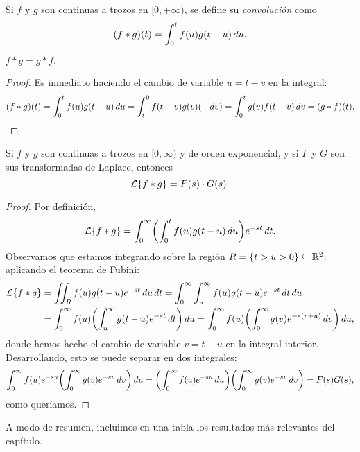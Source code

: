 \documentclass[../ecuaciones_diferenciales.tex]{subfiles}
\begin{document}
\begin{definition}
	Si \(f\) y \(g\) son continuas a trozos en \([0,+\infty)\), se define su
	\emph{convolución} como
	\[(f \ast g)(t) = \int_0^t f(u) g(t-u) \mathop{d\!} u.\]
\end{definition}

\begin{remark}
	\(f \ast g = g \ast f.\)
	\begin{proof}
		Es inmediato haciendo el cambio de variable \(u = t-v\) en la integral:
		\[(f \ast g)(t) = \int_0^t f(u) g(t-u) \mathop{d\!} u = \int_t^0 f(t-v)g(v)
			(-\mathop{d\!} v) = \int_0^t g(v) f(t-v) \mathop{d\!} v = (g \ast f)(t).\]
	\end{proof}
\end{remark}

\begin{theorem}
	Si \(f\) y \(g\) son continuas a trozos en \([0,\infty)\) y de orden
	exponencial, y si \(F\) y \(G\) son sus transformadas de Laplace, entonces
	\[\operatorname{\mathcal{L}}\{f \ast g\} = F(s) \cdot G(s).\]
	\begin{proof}
		Por definición,
		\[\laplace\{f \ast g\} = \int_0^\infty \left( \int_0^t f(u)g(t-u) \dif u \right)
			e^{-st} \dif t.\]
		Observamos que estamos integrando sobre la región \(R = \{t > u > 0\} \subseteq
		\mathbb{R}^2\); aplicando el teorema de Fubini:
		\begin{align*}
			\laplace\{f \ast g\}
			 & = \iint_R f(u) g(t-u) e^{-st} \dif u \dif t
			= \int_0^\infty \int_u^\infty f(u)g(t-u)e^{-st} \dif t \dif u            \\
			 & = \int_0^\infty f(u) \left(\int_u^\infty g(t-u)e^{-st} \dif t \right)
			\dif u = \int_0^\infty f(u) \left( \int_0^\infty g(v)e^{-s(v+u)} \dif v
			\right) \dif u,
		\end{align*}
		donde hemos hecho el cambio de variable \(v = t-u\) en la integral
		interior. Desarrollando, esto se puede separar en dos integrales:
		\[\int_0^\infty f(u) e^{-su} \left( \int_0^\infty g(v)e^{-sv} \dif v \right) \dif u
			= \left( \int_0^\infty f(u)e^{-su} \dif u \right)
			\left( \int_0^\infty g(v)e^{-sv} \dif v \right)
			= F(s) G(s),\]
		como queríamos.
	\end{proof}
\end{theorem}

A modo de resumen, incluimos en una tabla los resultados más relevantes del
capítulo.
\end{document}
